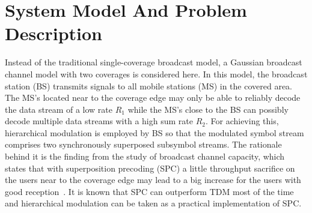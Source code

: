 \documentclass[conference]{IEEEtran}
\begin{document}
\section{System Model And Problem Description}

Instead of the traditional single-coverage broadcast model, a
Gaussian broadcast channel model with two coverages is considered
here. In this model, the broadcast station (BS) transmits signals
to all mobile stations (MS) in the covered area. The MS's located
near to the coverage edge may only be able to reliably decode the
data stream of a low rate $R_1$ while the MS's close to the BS can
possibly decode multiple data streams with a high sum rate $R_2$.
For achieving this, hierarchical modulation is employed by BS so
that the modulated symbol stream comprises two synchronously
superposed subsymbol streams. The rationale behind it is the
finding from the study of broadcast channel capacity, which states
that with superposition precoding (SPC) a little throughput
sacrifice on the users near to the coverage edge may lead to a big
increase for the users with good reception~\cite{Cover72}. It is
known that SPC can outperform TDM most of the time and
hierarchical modulation can be taken as a practical implementation
of SPC.
\end{document}
